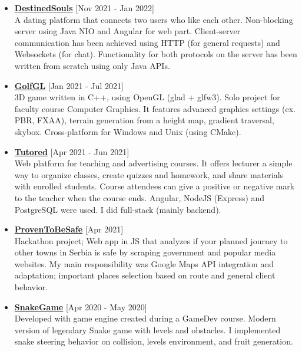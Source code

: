 \documentclass[a4paper]{moderncv}
\begin{document}
		\begin{itemize}

			\item \textbf{\href{https://github.com/MATF-Computer-Networks-Projects/2021_DestinedSouls}{DestinedSouls}} \hfill[Nov 2021 - Jan 2022]\\
			A dating platform that connects two users who like each other. Non-blocking server using Java NIO and Angular for 
			web part. Client-server communication has been achieved using HTTP (for general requests) and Websockets (for chat).
			Functionality for both protocols on the server has been written from scratch using only Java APIs.
						
			\item \textbf{\href{https://github.com/djordjetane/GolfGL}{GolfGL}} \hfill[Jan 2021 - Jul 2021]\\
			3D game written in C++, using OpenGL (glad + glfw3). Solo project for faculty course Computer Graphics. 
			It features advanced graphics settings (ex. PBR, FXAA), terrain generation from a height map, gradient traversal, skybox.
			Cross-platform for Windows and Unix (using CMake).

			\item \textbf{\href{https://gitlab.com/matfpveb/projekti/2020-2021/18-Tutored}{Tutored}} \hfill[Apr 2021 - Jun 2021]\\
			Web platform for teaching and advertising courses. It offers lecturer a simple way to organize classes, create quizzes and homework, and share materials with enrolled students.
			Course attendees can give a positive or negative mark to the teacher when the course ends. Angular, NodeJS (Express) and PostgreSQL were used. 
			I did full-stack (mainly backend).

			\item \textbf{\href{https://github.com/idakucamupeva/dokazano_bezbedno}{ProvenToBeSafe}} \hfill[Apr 2021]\\
			Hackathon project; Web app in JS that analyzes if your planned journey to other towns in Serbia is safe by scraping
			government and popular media websites. My main responsibility was Google Maps API integration and adaptation; 
			important places selection based on route and general client behavior.
		
			\item \textbf{\href{https://github.com/djordjetane/SnakeGame}{SnakeGame}} \hfill[Apr 2020 - May 2020]\\
			Developed with game engine created during a GameDev course. Modern version of legendary Snake game with levels 
			and obstacles. I implemented snake steering behavior on collision, levels environment, and fruit generation.


\end{itemize}
\end{document}
